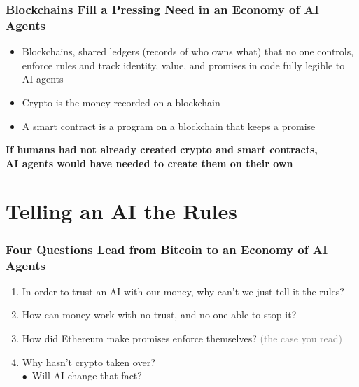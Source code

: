 \documentclass[aspectratio=169]{beamer}
\newcommand{\bi}{\begin{itemize}}
\newcommand{\ei}{\end{itemize}}
\newcommand{\m}{\item}
\newcommand{\be}{\begin{enumerate}}
\newcommand{\ee}{\end{enumerate}}
\begin{document}
\begin{frame}[label=main-thesis]
\frametitle{Blockchains Fill a Pressing Need in an Economy of AI Agents}

\bi
\m Blockchains, shared ledgers (records of who owns what) that no one controls, enforce rules and track identity, value, and promises in code fully legible to AI agents
\m Crypto is the money recorded on a blockchain
\m A smart contract is a program on a blockchain that keeps a promise
\ei
\vspace{6mm}
\begin{center}
{\large\textcolor{gtnavy}{\textbf{If humans had not already created crypto and smart contracts,\\ AI agents would have needed to create them on their own}}}
\end{center}
\par\vspace{0pt plus 1fill}\hfill{\scriptsize \hyperlink{appx-agentsnow}{}}
\end{frame}


\section{Telling an AI the Rules}
\begin{frame}[label=main-preview]
\frametitle{Four Questions Lead from Bitcoin to an Economy of AI Agents}

\vfill
{\large
\be
\setlength{\itemsep}{3mm}
\m In order to trust an AI with our money, why can't we just tell it the rules?
\m How can money work with no trust, and no one able to stop it?
\m How did Ethereum make promises enforce themselves? \textcolor{gray}{\normalsize (the case you read)}
\m Why hasn't crypto taken over?\\ \hspace*{6mm}$\bullet$\ Will AI change that fact?
\ee}
\vfill
\end{frame}
\end{document}
